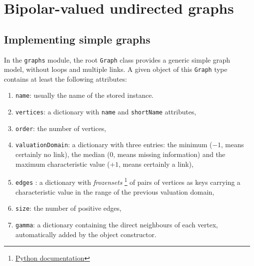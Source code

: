 \chapter{Bipolar-valued undirected graphs}
\label{sec:21}



\section{Implementing simple graphs}
\label{sec:21.1}

In the \Digraph \texttt{graphs} module, the root \texttt{Graph} class  provides a generic simple graph model, without loops and multiple links. A given object of this \texttt{Graph} type contains at least the following attributes:
\begin{enumerate}[topsep=1pt]
\item \texttt{name}: usually the name of the stored instance.
\item \texttt{vertices}: a dictionary with \texttt{name} and \texttt{shortName} attributes,
\item \texttt{order}: the number of vertices,
\item \texttt{valuationDomain}: a dictionary with three entries: the minimum ($-1$, means certainly no link), the median ($0$, means missing information) and the maximum characteristic value ($+1$, means certainly a link),
\item \texttt{edges} : a dictionary with \emph{frozensets} \footnote{\href{https://docs.python.org/3.9/library/stdtypes.html?highlight=frozenset\#frozenset}{Python documentation}} of pairs of vertices as keys carrying a characteristic value in the range of the previous valuation domain,
\item \texttt{size}: the number of positive edges,
\item \texttt{gamma}: a dictionary containing the direct neighbours of each vertex, automatically added by the object constructor.
\end{enumerate}

